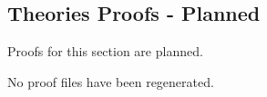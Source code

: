 \subsection*{Theories Proofs - Planned}

\begin{remark*}
Proofs for this section are planned.
\end{remark*}

\begin{remark*}
No proof files have been regenerated.
\end{remark*}
